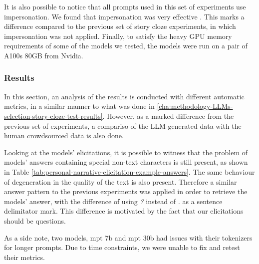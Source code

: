 It is also possible to notice that all prompts used in this set of experiments use impersonation. We found that impersonation was very effective \cite{impersonation}. This marks a difference compared to the previous set of story cloze experiments, in which impersonation was not applied. Finally, to satisfy the heavy GPU memory requirements of some of the models we tested, the models were run on a pair of A100s 80GB from Nvidia.
\subsubsection{Results}
\label{cha:methodology-personal-narrative-elicitation-results}
In this section, an analysis of the results is conducted with different automatic metrics, in a similar manner to what was done in \ref{cha:methodology-LLMs-selection-story-cloze-test-results}. However, as a marked difference from the previous set of experiments, a compariso of the LLM-generated data with the human crowdsourced data is also done.


Looking at the models' elicitations, it is possible to witness that the problem of models' answers containing special non-text characters is still present, as shown in Table \ref{tab:personal-narrative-elicitation-example-answers}. The same behaviour of degeneration in the quality of the text is also present. Therefore a similar answer pattern to the previous experiments was applied in order to retrieve the models' answer, with the difference of using \emph{?} instead of \emph{.} as a sentence delimitator mark. This difference is motivated by the fact that our elicitations should be questions.
% 

As a side note, two models, mpt 7b and mpt 30b had issues with their tokenizers for longer prompts. Due to time constraints, we were unable to fix and retest their metrics.

